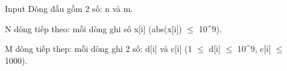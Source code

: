 Input
Dòng đầu gồm 2 số: n và m.

N dòng tiếp theo: mỗi dòng ghi số x[i] (abs(x[i])  $\le$  10^9).

M dòng tiếp thep: mỗi dòng ghi 2 số: d[i] và c[i] (1  $\le$  d[i]  $\le$  10^9, c[i]  $\le$  1000).